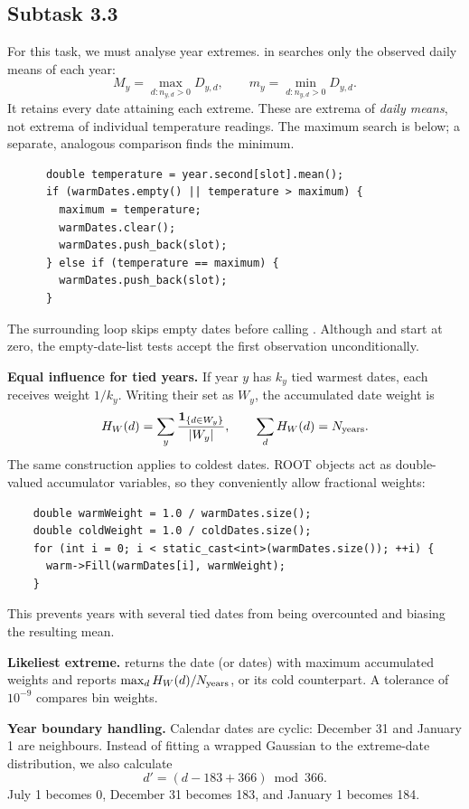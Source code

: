 \subsection{Subtask 3.3}
For this task, we must analyse year extremes.  in  searches only the observed daily means of each year:
\[
 M_y=\max_{d:n_{y,d}>0}D_{y,d},\qquad
 m_y=\min_{d:n_{y,d}>0}D_{y,d}.
\]
It retains every date attaining each extreme. These are extrema of \emph{daily means}, not extrema of individual temperature readings. The maximum search is below; a separate, analogous comparison finds the minimum.
\begin{lstlisting}
      double temperature = year.second[slot].mean();
      if (warmDates.empty() || temperature > maximum) {
        maximum = temperature;
        warmDates.clear();
        warmDates.push_back(slot);
      } else if (temperature == maximum) {
        warmDates.push_back(slot);
      }
\end{lstlisting}
The surrounding loop skips empty dates before calling . Although  and  start at zero, the empty-date-list tests accept the first observation unconditionally. 

\textbf{Equal influence for tied years.} If year $y$ has $k_y$ tied warmest
dates, each receives weight $1/k_y$. Writing their set as $W_y$, the accumulated
date weight is
\[
 H_W(d)=\sum_y\frac{\mathbf{1}_{\{d\in W_y\}}}{|W_y|},
 \qquad \sum_d H_W(d)=N_{\rm years}.
\]
The same construction applies to coldest dates. ROOT  objects act as double-valued accumulator variables, so they conveniently allow fractional weights:
\begin{lstlisting}
    double warmWeight = 1.0 / warmDates.size();
    double coldWeight = 1.0 / coldDates.size();
    for (int i = 0; i < static_cast<int>(warmDates.size()); ++i) {
      warm->Fill(warmDates[i], warmWeight);
    }
\end{lstlisting}
This prevents years with several tied dates from being overcounted and biasing the resulting mean.

\textbf{Likeliest extreme.}  returns the date (or dates) with maximum accumulated weights and reports $\max_d H_W(d)/N_{\rm years}$, or its cold counterpart. A tolerance of $10^{-9}$ compares bin weights.

\textbf{Year boundary handling.}  Calendar dates are cyclic:
December 31 and January 1 are neighbours. Instead of fitting a wrapped Gaussian
to the extreme-date distribution, we also calculate
\[
 d'=(d-183+366)\bmod 366.
\]
July 1 becomes 0, December 31 becomes 183, and January 1 becomes 184.

